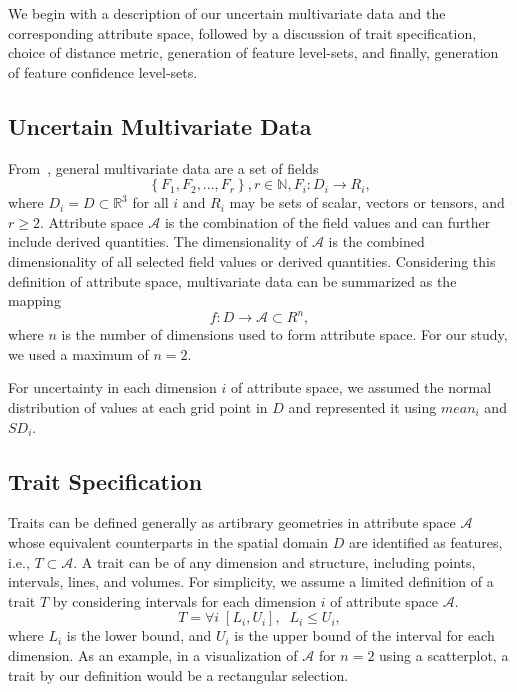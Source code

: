 
We begin with a description of our uncertain multivariate data and the corresponding attribute space, followed by a discussion of trait specification, choice of distance metric, generation of feature level-sets, and finally, generation of feature confidence level-sets.

\vspace{-2mm}
\subsection{Uncertain Multivariate Data}
%
From~\cite{jankowai2020feature}, general multivariate data are a set of fields
\begin{equation}
\left\{F_{1},F_{2},...,F_{r}\right\}, r\in\mathbb{N}, F_{i}:D_{i} \to R_{i},
\end{equation}
where $D_{i} = D \subset \mathbb{R}^{3}$ for all $i$ and $R_{i}$ may be sets of scalar, vectors or tensors, and $r\geq2$.
%
Attribute space $\mathcal{A}$ is the combination of the field values and can further include derived quantities.
%
The dimensionality of $\mathcal{A}$ is the combined dimensionality of all selected field values or derived quantities.
%
Considering this definition of attribute space, multivariate data can be summarized as the mapping
\begin{equation}
f : D \to \mathcal{A} \subset R^{n},
\end{equation}
%
where $n$ is the number of dimensions used to form attribute space. 
%
For our study, we used a maximum of $n = 2$. 
%

For uncertainty in each dimension $i$ of attribute space, we assumed the normal distribution of values at each grid point in $D$ and represented it using $mean_{i}$ and $SD_{i}$. 

\vspace{-2mm}
\subsection{Trait Specification}
Traits can be defined generally as artibrary geometries in attribute space $\mathcal{A}$ whose equivalent counterparts in the spatial domain $D$ are identified as features, i.e., $T\subset\mathcal{A}$.
%
A trait can be of any dimension and structure, including points, intervals, lines, and volumes.
%
%
For simplicity, we assume a limited definition of a trait $T$ by considering intervals for each dimension $i$ of attribute space $\mathcal{A}$.
%
\begin{equation}	
T = \forall{i}\;[L_{i}, U_{i}], \;\;L_{i} \leqslant U_{i}, 
\end{equation}
where $L_{i}$ is the lower bound, and $U_{i}$ is the upper bound of the interval for each dimension.
%
As an example, in a visualization of $\mathcal{A}$ for $n = 2$ using a scatterplot, a trait by our definition would be a rectangular selection.

